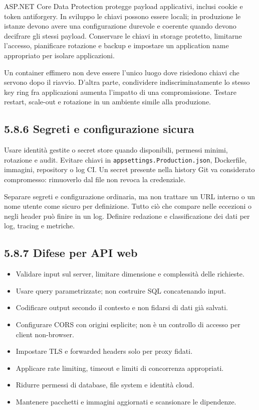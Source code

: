 \documentclass[
  italian,
  10pt,
]{book}
\providecommand{\tightlist}{%
  \setlength{\itemsep}{0pt}\setlength{\parskip}{0pt}}
\begin{document}
ASP.NET Core Data Protection protegge payload applicativi, inclusi
cookie e token antiforgery. In sviluppo le chiavi possono essere locali;
in produzione le istanze devono avere una configurazione durevole e
coerente quando devono decifrare gli stessi payload. Conservare le
chiavi in storage protetto, limitarne l'accesso, pianificare rotazione e
backup e impostare un application name appropriato per isolare
applicazioni.

Un container effimero non deve essere l'unico luogo dove risiedono
chiavi che servono dopo il riavvio. D'altra parte, condividere
indiscriminatamente lo stesso key ring fra applicazioni aumenta
l'impatto di una compromissione. Testare restart, scale-out e rotazione
in un ambiente simile alla produzione.

\subsection{5.8.6 Segreti e configurazione
sicura}\label{segreti-e-configurazione-sicura}

Usare identità gestite o secret store quando disponibili, permessi
minimi, rotazione e audit. Evitare chiavi in
\texttt{appsettings.Production.json}, Dockerfile, immagini, repository o
log CI. Un secret presente nella history Git va considerato compromesso:
rimuoverlo dal file non revoca la credenziale.

Separare segreti e configurazione ordinaria, ma non trattare un URL
interno o un nome utente come sicuro per definizione. Tutto ciò che
compare nelle eccezioni o negli header può finire in un log. Definire
redazione e classificazione dei dati per log, tracing e metriche.

\subsection{5.8.7 Difese per API web}\label{difese-per-api-web}

\begin{itemize}
\tightlist
\item
  Validare input sul server, limitare dimensione e complessità delle
  richieste.
\item
  Usare query parametrizzate; non costruire SQL concatenando input.
\item
  Codificare output secondo il contesto e non fidarsi di dati già
  salvati.
\item
  Configurare CORS con origini esplicite; non è un controllo di accesso
  per client non-browser.
\item
  Impostare TLS e forwarded headers solo per proxy fidati.
\item
  Applicare rate limiting, timeout e limiti di concorrenza appropriati.
\item
  Ridurre permessi di database, file system e identità cloud.
\item
  Mantenere pacchetti e immagini aggiornati e scansionare le dipendenze.
\end{itemize}
\end{document}
